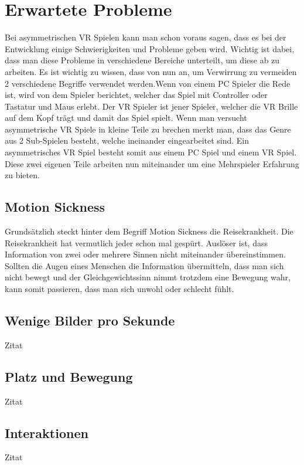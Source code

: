 \section{Erwartete Probleme}
Bei asymmetrischen VR Spielen kann man schon voraus sagen, dass es bei der Entwicklung einige Schwierigkeiten und Probleme geben wird. Wichtig ist dabei, dass man diese Probleme in verschiedene Bereiche unterteilt, um diese ab zu arbeiten. Es ist wichtig zu wissen, dass von nun an, um Verwirrung zu vermeiden 2 verschiedene Begriffe verwendet werden.Wenn von einem PC Spieler die Rede ist, wird von dem Spieler berichtet, welcher das Spiel mit Controller oder Tastatur und Maus erlebt. Der VR Spieler ist jener Spieler, welcher die VR Brille auf dem Kopf trägt und damit das Spiel spielt. Wenn man versucht asymmetrische VR Spiele in kleine Teile zu brechen merkt man, dass das Genre aus 2 Sub-Spielen besteht, welche ineinander eingearbeitet sind. Ein asymmetrisches VR Spiel besteht somit aus einem PC Spiel und einem VR Spiel. Diese zwei eigenen Teile arbeiten nun miteinander um eine Mehrspieler Erfahrung zu bieten.

\subsection{Motion Sickness}
Grundsätzlich steckt hinter dem Begriff Motion Sickness die Reisekrankheit. Die Reisekrankheit hat vermutlich jeder schon mal gespürt. Auslöser ist, dass Information von zwei oder mehrere Sinnen nicht miteinander übereinstimmen. Sollten die Augen eines Menschen die Information übermitteln, dass man sich nicht bewegt und der Gleichgewichtssinn nimmt trotzdem eine Bewegung wahr, kann somit passieren, dass man sich unwohl oder schlecht fühlt.

\subsection{Wenige Bilder pro Sekunde}
Zitat \cite{bobsch 123 bobsch}

\subsection{Platz und Bewegung}
Zitat \cite{bobsch 123 bobsch}

\subsection{Interaktionen}
Zitat \cite{bobsch 123 bobsch}